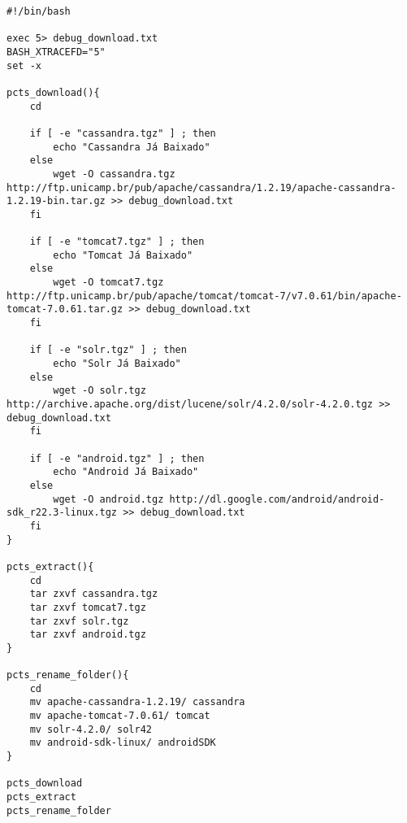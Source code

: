 \begin{lstlisting}[style=Bash]
#!/bin/bash

exec 5> debug_download.txt
BASH_XTRACEFD="5"
set -x

pcts_download(){
	cd 

	if [ -e "cassandra.tgz" ] ; then
		echo "Cassandra Já Baixado"
	else
		wget -O cassandra.tgz http://ftp.unicamp.br/pub/apache/cassandra/1.2.19/apache-cassandra-1.2.19-bin.tar.gz >> debug_download.txt
	fi

	if [ -e "tomcat7.tgz" ] ; then
		echo "Tomcat Já Baixado"
	else	
		wget -O tomcat7.tgz http://ftp.unicamp.br/pub/apache/tomcat/tomcat-7/v7.0.61/bin/apache-tomcat-7.0.61.tar.gz >> debug_download.txt
	fi

	if [ -e "solr.tgz" ] ; then
		echo "Solr Já Baixado"
	else
		wget -O solr.tgz http://archive.apache.org/dist/lucene/solr/4.2.0/solr-4.2.0.tgz >> debug_download.txt
	fi

	if [ -e "android.tgz" ] ; then
		echo "Android Já Baixado"
	else
		wget -O android.tgz http://dl.google.com/android/android-sdk_r22.3-linux.tgz >> debug_download.txt
	fi
}

pcts_extract(){
	cd 
	tar zxvf cassandra.tgz 
	tar zxvf tomcat7.tgz 
	tar zxvf solr.tgz 
	tar zxvf android.tgz 
}

pcts_rename_folder(){
	cd 
	mv apache-cassandra-1.2.19/ cassandra 
	mv apache-tomcat-7.0.61/ tomcat 
	mv solr-4.2.0/ solr42 
	mv android-sdk-linux/ androidSDK 
}

pcts_download
pcts_extract
pcts_rename_folder
\end{lstlisting}
